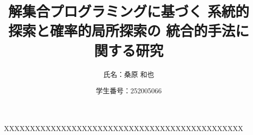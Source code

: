 \documentclass[dvipdfmx,a4paper]{jsarticle}
\title{解集合プログラミングに基づく
系統的探索と確率的局所探索の
統合的手法に関する研究}
\author{氏名：桑原 和也}
\date{学生番号：252005066}
\begin{document}
\maketitle

XXXXXXXXXXXXXXXXXXXXXXXXXXXXXXXXXXXXXXXXXXXXXX
\end{document}
